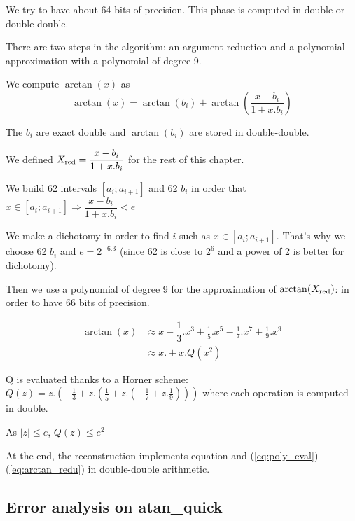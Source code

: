 We try to have about 64 bits of precision. This phase is computed in double
or double-double.

There are two steps in the algorithm: an argument reduction and a polynomial
approximation with a polynomial of degree 9. 

We compute $\arctan(x)$ as 
\begin{equation}
\arctan(x) = \arctan( b_i ) + \arctan(\frac{x-b_i}{1+x.b_i}) \label{eq:arctan_redu}
\end{equation}

The $b_i$ are exact double and $\arctan(b_i)$ are stored in
double-double.

We defined $X_{\mathrm{red}} = \dfrac{x-b_i}{1+x.b_i}$ for the rest of this chapter.

We build 62 intervals $[a_i;a_{i+1}]$ and 62 $b_i$ in order that $ x \in
[a_i;a_{i+1}] \Rightarrow \dfrac{x-b_i}{1+x.b_i} < e$

We make a dichotomy in order to find $i$ such as $ x \in [a_i;a_{i+1}]
$. That's why we choose 62 $b_i$ and $e=2^{-6.3}$ (since 62 is close to
$2^6$ and a power of 2 is better for dichotomy).

Then we use a polynomial of degree 9 for the approximation of $\arctan(X_{\mathrm{red}})$:
in order to have 66 bits of precision.

\begin{equation}
\begin{split} \arctan(x)& \approx x - \dfrac{1}{3} .x^3 + \frac{1}{5}.x^5
- \frac{1}{7}.x^7 + \frac{1}{9}.x^9 \nonumber \\ \label{eq:poly_eval}
  & \approx x . + x.Q(x^2)
\end{split}
\end{equation}
 
Q is evaluated thanks to a Horner scheme:
$ Q(z) = z. (-\frac{1}{3} + z.(\frac{1}{5} + z.(-\frac{1}{7} +
z.\frac{1}{9}))) $
where each operation is computed in double.

As $|z| \leq e$, $Q(z) \leq e^2$

At the end, the reconstruction implements equation and (\ref{eq:poly_eval})  
(\ref{eq:arctan_redu}) in double-double
arithmetic.


\bigskip
\subsection{Error analysis on atan\_quick}


